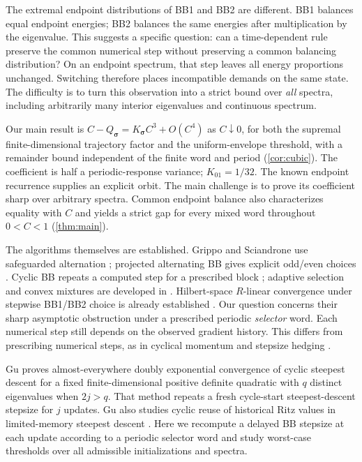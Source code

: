 \documentclass[letterpaper,twoside]{article}
\begin{document}
The extremal endpoint distributions of BB1 and BB2 are different. BB1 balances equal endpoint energies; BB2 balances the same energies after multiplication by the eigenvalue. This suggests a specific question: can a time-dependent rule preserve the common numerical step without preserving a common balancing distribution? On an endpoint spectrum, that step leaves all energy proportions unchanged. Switching therefore places incompatible demands on the same state. The difficulty is to turn this observation into a strict bound over \emph{all} spectra, including arbitrarily many interior eigenvalues and continuous spectrum.

Our main result is $C-Q_{\bm\sigma}=K_{\bm\sigma}C^3+O(C^4)$ as $C\downarrow0$, for both the supremal finite-dimensional trajectory factor and the uniform-envelope threshold, with a remainder bound independent of the finite word and period (\cref{cor:cubic}). The coefficient is half a periodic-response variance; $K_{01}=1/32$. The known endpoint recurrence \cite{DaiHuangLiu2019} supplies an explicit orbit. The main challenge is to prove its coefficient sharp over arbitrary spectra. Common endpoint balance also characterizes equality with $C$ and yields a strict gap for every mixed word throughout $0<C<1$ (\cref{thm:main}).

The algorithms themselves are established. Grippo and Sciandrone use safeguarded alternation \cite{GrippoSciandrone2002}; projected alternating BB gives explicit odd/even choices \cite{DaiFletcherProjected2005}. Cyclic BB repeats a computed step for a prescribed block \cite{DaiHagerSchittkowskiZhang2006}; adaptive selection and convex mixtures are developed in \cite{ZhouGaoDai2006,FrassoldatiZanniZanghirati2008,DaiHuangLiu2019}. Hilbert-space $R$-linear convergence under stepwise BB1/BB2 choice is already established \cite{AzmiKunisch2020}. Our question concerns their sharp asymptotic obstruction under a prescribed periodic \emph{selector} word. Each numerical step still depends on the observed gradient history. This differs from prescribing numerical steps, as in cyclical momentum \cite{GoujaudScieurDieuleveutTaylorPedregosa2022} and stepsize hedging \cite{AltschulerParrilo2025a}.

Gu \cite[Theorem~2.1]{Gu2026CSD} proves almost-everywhere doubly exponential convergence of cyclic steepest descent for a fixed finite-dimensional positive definite quadratic with $q$ distinct eigenvalues when $2j>q$. That method repeats a fresh cycle-start steepest-descent stepsize for $j$ updates. Gu also studies cyclic reuse of historical Ritz values in limited-memory steepest descent \cite{Gu2026Ritz}. Here we recompute a delayed BB stepsize at each update according to a periodic selector word and study worst-case thresholds over all admissible initializations and spectra.
\end{document}
